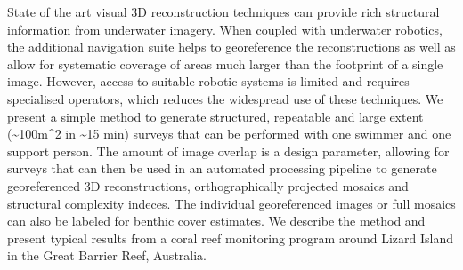 
State of the art visual 3D reconstruction techniques can provide rich structural information from underwater imagery. When coupled with underwater robotics, the additional navigation suite helps to georeference the reconstructions as well as allow for systematic coverage of areas much larger than the footprint of a single image. However, access to suitable robotic systems is limited and requires specialised operators, which reduces the widespread use of these techniques.
We present a simple method to generate structured, repeatable and large extent (\sim{100m^{2}} in \sim{15 min}) surveys that can be performed with one swimmer and one support person. The amount of image overlap is a design parameter, allowing for surveys that can then be used in an automated processing pipeline to generate georeferenced 3D reconstructions, orthographically projected mosaics and structural complexity indeces. The individual georeferenced images or full mosaics can also be labeled for benthic cover estimates.
We describe the method and present typical results from a coral reef monitoring program around Lizard Island in the Great Barrier Reef, Australia.
  
  